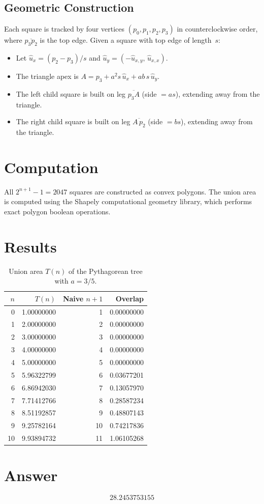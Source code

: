 \documentclass[11pt]{article}
\begin{document}
\subsection{Geometric Construction}

Each square is tracked by four vertices $(p_0, p_1, p_2, p_3)$ in
counterclockwise order, where $\overline{p_3 p_2}$ is the top edge. Given
a square with top edge of length~$s$:
\begin{itemize}
    \item Let $\hat{u}_x = (p_2 - p_3)/s$ and
          $\hat{u}_y = (-\hat{u}_{x,y},\, \hat{u}_{x,x})$.
    \item The triangle apex is
          $A = p_3 + a^2 s\, \hat{u}_x + ab\, s\, \hat{u}_y$.
    \item The left child square is built on leg $\overline{p_3 A}$ (side $= as$),
          extending away from the triangle.
    \item The right child square is built on leg $\overline{A\, p_2}$ (side $= bs$),
          extending away from the triangle.
\end{itemize}

\section{Computation}

All $2^{n+1} - 1 = 2047$ squares are constructed as convex polygons. The union
area is computed using the Shapely computational geometry library, which
performs exact polygon boolean operations.

\section{Results}

\begin{table}[h]
\centering
\begin{tabular}{rrrr}
\toprule
$n$ & $T(n)$ & Naive $n{+}1$ & Overlap \\
\midrule
0  & 1.00000000 &  1 & 0.00000000 \\
1  & 2.00000000 &  2 & 0.00000000 \\
2  & 3.00000000 &  3 & 0.00000000 \\
3  & 4.00000000 &  4 & 0.00000000 \\
4  & 5.00000000 &  5 & 0.00000000 \\
5  & 5.96322799 &  6 & 0.03677201 \\
6  & 6.86942030 &  7 & 0.13057970 \\
7  & 7.71412766 &  8 & 0.28587234 \\
8  & 8.51192857 &  9 & 0.48807143 \\
9  & 9.25782164 & 10 & 0.74217836 \\
10 & 9.93894732 & 11 & 1.06105268 \\
\bottomrule
\end{tabular}
\caption{Union area $T(n)$ of the Pythagorean tree with $a = 3/5$.}
\end{table}

\section{Answer}

\[
\boxed{28.2453753155}
\]
\end{document}
